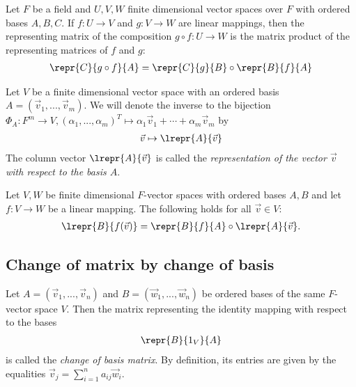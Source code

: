 \documentclass{article}
\begin{document}
\begin{theorem}[Theorem 2.3.2]
	Let $F$ be a field and $U,V,W$ finite dimensional vector spaces over $F$ with ordered bases
	$A,B,C$. If $f:U\to V$ and $g:V\to W$ are linear mappings, then the representing matrix of
	the composition $g\circ f:U\to W$ is the matrix product of the representing matrices of
	$f$ and $g$:
	\begin{align*}
		\repr{C}{g\circ f}{A}=\repr{C}{g}{B}\circ\repr{B}{f}{A}
	\end{align*}
\end{theorem}

\begin{definition}
	Let $V$ be a finite dimensional vector space with an ordered basis $A=(\vec v_1,...,\vec v_m)$.
	We will denote the inverse to the bijection $\Phi_A:F^m\to V,(\alpha_1,...,\alpha_m)^T\mapsto \alpha_1\vec v_1+\cdots+\alpha_m\vec v_m$
	by
	\begin{align*}
		\vec v \mapsto \lrepr{A}{\vec v}
	\end{align*}
	The column vector $\lrepr{A}{\vec v}$ is called the \emph{representation of the vector $\vec v$
		with respect to the basis $A$}.
\end{definition}

\begin{theorem}[Theorem 2.3.4]
	Let $V,W$ be finite dimensional $F$-vector spaces with ordered bases $A,B$ and let $f:V\to W$
	be a linear mapping. The following holds for all $\vec v\in V$:
	\begin{align*}
		\lrepr{B}{f(\vec v)}=\repr{B}{f}{A} \circ \lrepr{A}{\vec v}.
	\end{align*}
\end{theorem}

\subsection{Change of matrix by change of basis}

\begin{definition}
	Let $A=(\vec v_1, ...,\vec v_n)$ and $B=(\vec w_1,...,\vec w_n)$ be ordered bases of the same
	$F$-vector space $V$. Then the matrix representing the identity mapping with respect to the
	bases
	\begin{align*}
		\repr{B}{1_V}{A}
	\end{align*}
	is called the \emph{change of basis matrix}. By definition, its entries are given by the
	equalities $\vec v_j=\sum_{i=1}^n a_{ij}\vec w_i$.
\end{definition}
\end{document}
